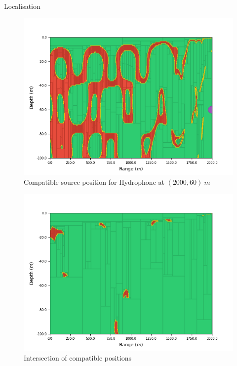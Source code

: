 \documentclass[9pt, xcolor={usenames, dvipsnames}]{beamer}
\begin{document}
\begin{frame}{Localisation}
\begin{minipage}[t][0.7\textheight][t]{0.48\textwidth}
\begin{overprint}
\begin{figure}
									\centering
									\includegraphics[width=\textwidth]{images/localisation/Hydrophone_60_2000.png}
									\caption{Compatible source position for Hydrophone at $(2000, 60)\ m$}
								\end{figure}
						\end{overprint}
					\end{minipage}
					\hfill
					\begin{minipage}[t][0.65\textheight][t]{0.46\textwidth}
						\begin{figure}
							\centering
							\includegraphics[width=\textwidth]{images/localisation/Intersection_20_40_60.png}
							\caption{Intersection of compatible positions}
						\end{figure}
					\end{minipage}
				\end{frame}
\end{document}
